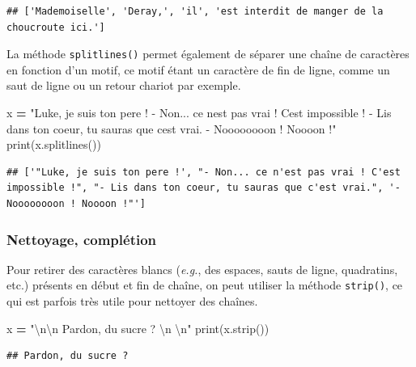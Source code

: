 \documentclass[
  12pt,
]{book}
\newenvironment{Shaded}{\begin{snugshade}}{\end{snugshade}}
\newcommand{\BuiltInTok}[1]{#1}
\newcommand{\CharTok}[1]{\textcolor[rgb]{0.31,0.60,0.02}{#1}}
\newcommand{\NormalTok}[1]{#1}
\newcommand{\OperatorTok}[1]{\textcolor[rgb]{0.81,0.36,0.00}{\textbf{#1}}}
\newcommand{\StringTok}[1]{\textcolor[rgb]{0.31,0.60,0.02}{#1}}
\numberwithin{equation}{section}
\numberwithin{countremarque}{section}
\begin{document}
\begin{lstlisting}
## ['Mademoiselle', 'Deray,', 'il', 'est interdit de manger de la choucroute ici.']
\end{lstlisting}

La méthode \texttt{splitlines()} permet également de séparer une chaîne de caractères en fonction d'un motif, ce motif étant un caractère de fin de ligne, comme un saut de ligne ou un retour chariot par exemple.

\begin{Shaded}
\begin{Highlighting}[]
\NormalTok{x }\OperatorTok{=} \StringTok{\textquotesingle{}\textquotesingle{}\textquotesingle{}"Luke, je suis ton pere !}
\StringTok{{-} Non... ce n\textquotesingle{}est pas vrai ! C\textquotesingle{}est impossible !}
\StringTok{{-} Lis dans ton coeur, tu sauras que c\textquotesingle{}est vrai.}
\StringTok{{-} Noooooooon ! Noooon !"\textquotesingle{}\textquotesingle{}\textquotesingle{}}
\BuiltInTok{print}\NormalTok{(x.splitlines())}
\end{Highlighting}
\end{Shaded}

\begin{lstlisting}
## ['"Luke, je suis ton pere !', "- Non... ce n'est pas vrai ! C'est impossible !", "- Lis dans ton coeur, tu sauras que c'est vrai.", '- Noooooooon ! Noooon !"']
\end{lstlisting}

\subsubsection{Nettoyage, complétion}\label{nettoyage-compluxe9tion}

Pour retirer des caractères blancs (\emph{e.g.}, des espaces, sauts de ligne, quadratins, etc.) présents en début et fin de chaîne, on peut utiliser la méthode \texttt{strip()}, ce qui est parfois très utile pour nettoyer des chaînes.

\begin{Shaded}
\begin{Highlighting}[]
\NormalTok{x }\OperatorTok{=} \StringTok{"}\CharTok{\textbackslash{}n\textbackslash{}n}\StringTok{    Pardon, du sucre ?     }\CharTok{\textbackslash{}n}\StringTok{  }\CharTok{\textbackslash{}n}\StringTok{"}
\BuiltInTok{print}\NormalTok{(x.strip())}
\end{Highlighting}
\end{Shaded}

\begin{lstlisting}
## Pardon, du sucre ?
\end{lstlisting}
\end{document}

